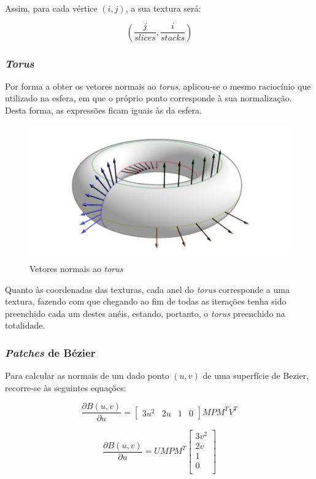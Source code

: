 \documentclass[a4paper, 11pt]{article}
\begin{document}
Assim, para cada vértice $(i, j)$, a sua textura será: 

$$\left(\frac{j}{slices} , \frac{i}{stacks}\right)$$

\subsubsection{\textit{Torus}}

Por forma a obter os vetores normais ao \textit{torus}, aplicou-se o mesmo raciocínio que 
utilizado na esfera, em que o próprio ponto corresponde à sua normalização. Desta forma, as 
expressões ficam iguais às da esfera.

\begin{figure}[H]
    \centering
    \includegraphics[width=.4\textwidth]{img/torus.png}
    \caption{Vetores normais ao \textit{torus}}
\end{figure}

Quanto às coordenadas das texturas, cada anel do \textit{torus} corresponde a uma textura, fazendo 
com que chegando ao fim de todas as iterações tenha sido preenchido cada um destes anéis, 
estando, portanto, o \textit{torus} preenchido na totalidade.

\subsubsection{\textit{Patches} de Bézier}

Para calcular as normais de um dado ponto $(u, v)$ de uma superfície de Bezier, recorre-se às 
seguintes equações:

\begin{equation*}
    \frac{\partial B(u, v)}{\partial u} = 
    \begin{bmatrix} 3u^2 & 2u & 1 & 0  \end{bmatrix} 
    M 
    P M^T V^T
\end{equation*}

\begin{equation*}
\frac{\partial B(u, v)}{\partial u} = UM
    P  
	M^T
	\begin{bmatrix}
	    3v^2 \\ 2v \\ 1 \\ 0 \\ 
	\end{bmatrix}
\end{equation*}
\end{document}
